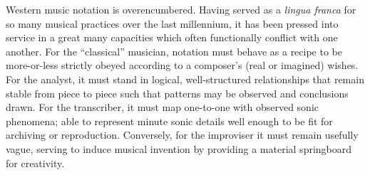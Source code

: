 

Western music notation is overencumbered. Having served as a \textit{lingua franca} for so many musical practices over the last millennium, it has been pressed into service in a great many capacities which often functionally conflict with one another.
For the ``classical'' musician, notation must behave as a recipe to be more-or-less strictly obeyed according to a composer's (real or imagined) wishes. 
For the analyst, it must stand in logical, well-structured relationships that remain stable from piece to piece such that patterns may be observed and conclusions drawn.
For the transcriber, it must map one-to-one with observed sonic phenomena; able to represent minute sonic details well enough to be fit for archiving or reproduction.
Conversely, for the improviser it must remain usefully vague, serving to induce musical invention by providing a material springboard for creativity.

